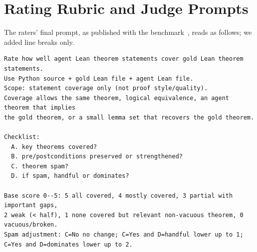 \section{Rating Rubric and Judge Prompts}
\label{app:rubric}
The raters' final prompt, as published with the benchmark~\citep{veribench2026}, reads as follows; we added line breaks only.
\begin{footnotesize}
\begin{verbatim}
Rate how well agent Lean theorem statements cover gold Lean theorem statements.
Use Python source + gold Lean file + agent Lean file.
Scope: statement coverage only (not proof style/quality).
Coverage allows the same theorem, logical equivalence, an agent theorem that implies
the gold theorem, or a small lemma set that recovers the gold theorem.

Checklist:
  A. key theorems covered?
  B. pre/postconditions preserved or strengthened?
  C. theorem spam?
  D. if spam, handful or dominates?

Base score 0--5: 5 all covered, 4 mostly covered, 3 partial with important gaps,
2 weak (< half), 1 none covered but relevant non-vacuous theorem, 0 vacuous/broken.
Spam adjustment: C=No no change; C=Yes and D=handful lower up to 1;
C=Yes and D=dominates lower up to 2.
\end{verbatim}
\end{footnotesize}

